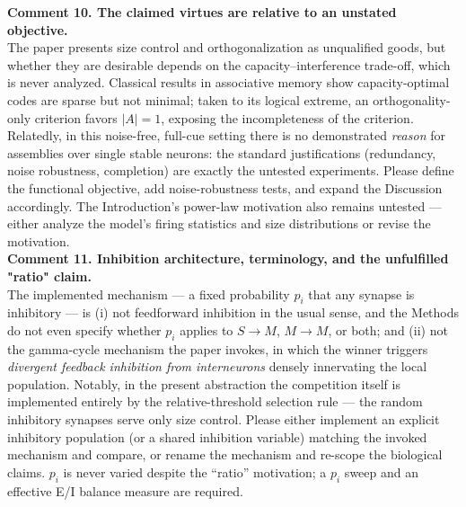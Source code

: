 \documentclass[a4paper, 11pt]{article}
\begin{document}
\noindent\textbf{Comment 10. The claimed virtues are relative to an unstated objective.}\\
The paper presents size control and orthogonalization as unqualified goods, but whether they are desirable depends on the capacity–interference trade-off, which is never analyzed. Classical results in associative memory show capacity-optimal codes are sparse but not minimal; taken to its logical extreme, an orthogonality-only criterion favors $|A| = 1$, exposing the incompleteness of the criterion. Relatedly, in this noise-free, full-cue setting there is no demonstrated \emph{reason} for assemblies over single stable neurons: the standard justifications (redundancy, noise robustness, completion) are exactly the untested experiments. Please define the functional objective, add noise-robustness tests, and expand the Discussion accordingly. The Introduction's power-law motivation also remains untested — either analyze the model's firing statistics and size distributions or revise the motivation.\\

\noindent \textbf{Comment 11. Inhibition architecture, terminology, and the unfulfilled "ratio" claim.}\\
The implemented mechanism — a fixed probability $p_i$ that any synapse is inhibitory — is (i) not feedforward inhibition in the usual sense, and the Methods do not even specify whether $p_i$ applies to $S \rightarrow M$, $M \rightarrow M$, or both; and (ii) not the gamma-cycle mechanism the paper invokes, in which the winner triggers \emph{divergent feedback inhibition from interneurons} densely innervating the local population. Notably, in the present abstraction the competition itself is implemented entirely by the relative-threshold selection rule — the random inhibitory synapses serve only size control. Please either implement an explicit inhibitory population (or a shared inhibition variable) matching the invoked mechanism and compare, or rename the mechanism and re-scope the biological claims. $p_i$ is never varied despite the ``ratio'' motivation; a $p_i$ sweep and an effective E/I balance measure are required.
\end{document}
